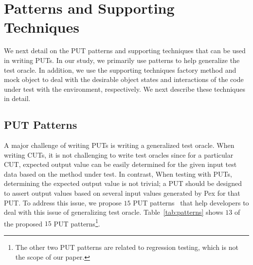 \section{Patterns and Supporting Techniques}
\label{sec:helper}

We next detail on the PUT patterns and supporting techniques that can be used in writing PUTs. In our study, we primarily use patterns to help generalize the test oracle. In addition, we use the supporting techniques factory method and mock object to deal with the desirable object states and interactions of the code under test with the environment, respectively. We next describe these techniques in detail.
\subsection{PUT Patterns}
\label{sec:patterns}

A major challenge of writing PUTs is writing a generalized test oracle. When writing CUTs, it is not challenging to write test oracles since for a particular CUT, expected output value can be easily determined for the given input test data based on the method under test. In contrast, When testing with PUTs, determining the expected output value is not trivial; a PUT should be designed to assert output values based on several input values generated by Pex for that PUT. To address this issue, we propose $15$ PUT patterns~\cite{halleux08:putpatterns} that help developers to deal with this issue of generalizing test oracle. Table~\ref{tab:patterns} shows $13$ of the proposed $15$ PUT patterns\footnote{The other two PUT patterns are related to regression testing, which is not the scope of our paper.}.

